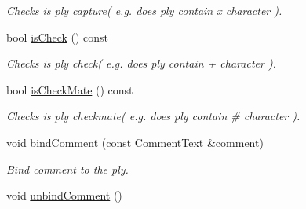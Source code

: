 \begin{DoxyCompactItemize}
\begin{DoxyCompactList}\small\item\em Checks is ply capture( e.g. does ply contain x character ). \item\end{DoxyCompactList}\item 
bool \hyperlink{classpgn_1_1Ply_aaef23816e7ae0bd8483e244d74a831a3}{isCheck} () const 
\begin{DoxyCompactList}\small\item\em Checks is ply check( e.g. does ply contain + character ). \item\end{DoxyCompactList}\item 
bool \hyperlink{classpgn_1_1Ply_a3fc793753433373ca1efc864c18a8ad3}{isCheckMate} () const 
\begin{DoxyCompactList}\small\item\em Checks is ply checkmate( e.g. does ply contain \# character ). \item\end{DoxyCompactList}\item 
void \hyperlink{classpgn_1_1Ply_a83d8ab3e980deb619f063432dfed59b5}{bindComment} (const \hyperlink{classpgn_1_1CommentText}{CommentText} \&comment)
\begin{DoxyCompactList}\small\item\em Bind comment to the ply. \item\end{DoxyCompactList}\item 
\hypertarget{classpgn_1_1Ply_a9858d87d0e386888115639eebd595f8a}{
void \hyperlink{classpgn_1_1Ply_a9858d87d0e386888115639eebd595f8a}{unbindComment} ()}
\label{classpgn_1_1Ply_a9858d87d0e386888115639eebd595f8a}


\end{DoxyCompactItemize}
